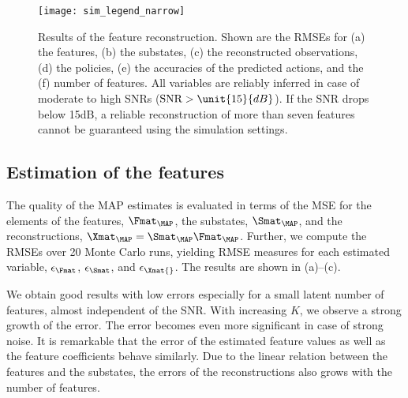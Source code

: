 \documentclass{article}
\begin{document}
\begin{figure}
  \centering  
  \texttt{[image: sim\_legend\_narrow]}  

   
  \caption{Results of the feature reconstruction. Shown are the \acp{RMSE} for (a) the features, (b) the substates, (c) the reconstructed observations, (d) the policies, (e) the accuracies of the predicted actions, and the (f) number of features. All variables are reliably inferred in case of moderate to high \acp{SNR} ($\SNR>\unit{15}{dB}$). If the \ac{SNR} drops below \unit{15}{dB}, a reliable reconstruction of more than seven features cannot be guaranteed using the simulation settings.}
  \label{fig::sim::FSZ}
\end{figure}


\subsection{Estimation of the features}
The quality of the \ac{MAP} estimates is evaluated in terms of the \ac{MSE} for the elements of the features, $\Fmat_\MAP$, the substates, $\Smat_\MAP$, and the reconstructions, $\Xmat_{\MAP} = \Smat_\MAP \Fmat_\MAP$. 
Further, we compute the \acp{RMSE} over 20 Monte Carlo runs, yielding \ac{RMSE} measures for each estimated variable, $\epsilon_\Fmat$, $\epsilon_\Smat$, and $\epsilon_{\Xmat{}}$.
The results are shown in (a)--(c). 

We obtain good results with low errors especially for a small latent number of features, almost independent of the \ac{SNR}.
With increasing $K$, we observe a strong growth of the error. 
The error becomes even more significant in case of strong noise. 
It is remarkable that the error of the estimated feature values as well as the feature coefficients behave similarly.
Due to the linear relation between the features and the substates, the errors of the reconstructions also grows with the number of features.
\end{document}
